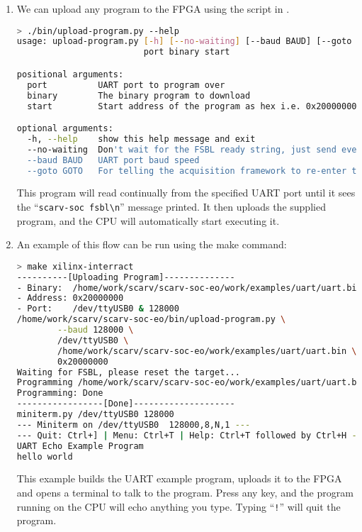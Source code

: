 \begin{enumerate}
\item We can upload any program to the FPGA using the script
    in .

\begin{lstlisting}[style=block,language=bash]
> ./bin/upload-program.py --help
usage: upload-program.py [-h] [--no-waiting] [--baud BAUD] [--goto GOTO]
                         port binary start

positional arguments:
  port          UART port to program over
  binary        The binary program to download
  start         Start address of the program as hex i.e. 0x20000000

optional arguments:
  -h, --help    show this help message and exit
  --no-waiting  Don't wait for the FSBL ready string, just send everything.
  --baud BAUD   UART port baud speed
  --goto GOTO   For telling the acquisition framework to re-enter the FSBL.
\end{lstlisting}

    This program will read continually from the specified UART port
    until it sees the ``{\tt scarv-soc fsbl\textbackslash n}'' message
    printed.  It then uploads the supplied program, and the CPU will
    automatically start executing it.

\item An example of this flow can be run using the make command:

\begin{lstlisting}[style=block,language=bash]
> make xilinx-interract
----------[Uploading Program]--------------
- Binary:  /home/work/scarv/scarv-soc-eo/work/examples/uart/uart.bin
- Address: 0x20000000
- Port:    /dev/ttyUSB0 & 128000
/home/work/scarv/scarv-soc-eo/bin/upload-program.py \
        --baud 128000 \
        /dev/ttyUSB0 \
        /home/work/scarv/scarv-soc-eo/work/examples/uart/uart.bin \
        0x20000000
Waiting for FSBL, please reset the target...
Programming /home/work/scarv/scarv-soc-eo/work/examples/uart/uart.bin, size=356, start=0x20000000
Programming: Done
-----------------[Done]--------------------
miniterm.py /dev/ttyUSB0 128000
--- Miniterm on /dev/ttyUSB0  128000,8,N,1 ---
--- Quit: Ctrl+] | Menu: Ctrl+T | Help: Ctrl+T followed by Ctrl+H ---
UART Echo Example Program
hello world
\end{lstlisting}
    
    This example builds the UART example program, uploads it to the
    FPGA and opens a terminal to talk to the program.
    Press any key, and the program running on the CPU will echo anything
    you type. Typing ``{\tt !}'' will quit the program.
\end{enumerate}

